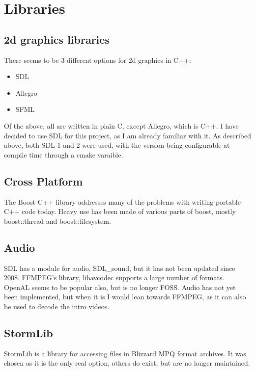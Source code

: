    	\newpage
    
   	\section{Libraries}
       	\subsection{2d graphics libraries}
    	There seems to be 3 different options for 2d graphics in C++:
    	\begin{itemize}
    	    \item{SDL}
    	    \item{Allegro}
    	    \item{SFML}
    	\end{itemize}
    	
    	Of the above, all are written in plain C, except Allegro, which is C++.
    	I have decided to use SDL for this project, as I am already familiar with it.
    	As described above, both SDL 1 and 2 were used, with the version being configurable at compile time through a cmake varaible.
    	
    	\subsection{Cross Platform}
        The Boost C++ library addresses many of the problems with writing portable C++ code today.
     	Heavy use has been made of various parts of boost, mostly boost::thread and boost::filesystem.
        
        \subsection{Audio}
        SDL has a module for audio, SDL\_sound\cite{sdls}, but it has not been updated since 2008.
        FFMPEG's library, libavcodec\cite{libavcodec} supports a large number of formats.
        OpenAL seems to be popular also, but is no longer FOSS.
        Audio has not yet been implemented, but when it is I would lean towards FFMPEG, as it can also be used to decode the intro videos.
        
        \subsection{StormLib}
        StormLib\cite{stormlib} is a library for accessing files in Blizzard MPQ format archives.
        It was chosen as it is the only real option, others do exist, but are no longer maintained.
